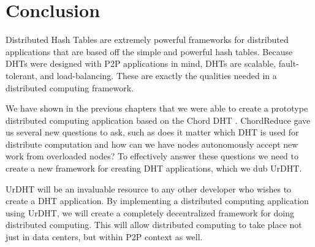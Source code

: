 \chapter{Conclusion}
\label{chapter:conclusion}
Distributed Hash Tables are extremely powerful frameworks for distributed applications that are based off the simple and powerful hash tables.
Because DHTs were designed with P2P applications in mind, DHTs are scalable, fault-tolerant, and load-balancing.
These are exactly the qualities needed in a distributed computing framework.

We have shown in the previous chapters that we were able to create a prototype distributed computing application \cite{chordreduce} based on the Chord DHT \cite{chord}.
ChordReduce gave us several new questions to ask, such as does it matter which DHT is used for distribute computation and how can we have nodes autonomously accept new work from overloaded nodes?
To effectively answer these questions we need to create a new framework for creating DHT applications, which we dub UrDHT.

UrDHT will be an invaluable resource to any other developer who wishes to create a DHT application.
By implementing a distributed computing application using UrDHT, we will create a completely decentralized framework for doing distributed computing.
This will allow distributed computing to take place not just in data centers, but within  P2P context as well.
